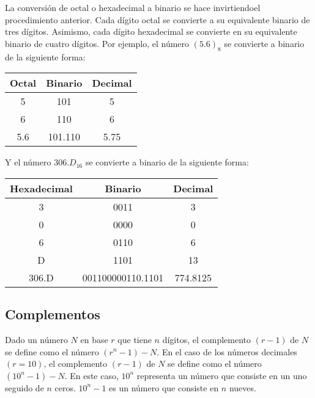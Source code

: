 \begin{metodo}
    La conversión de octal o hexadecimal a binario se hace invirtiendoel procedimiento anterior. Cada dígito octal se convierte a su equivalente binario de tres dígitos. Asimismo, cada dígito hexadecimal se convierte en su equivalente binario de cuatro dígitos. Por ejemplo, el número $(5.6)_8$ se convierte a binario de la siguiente forma:
    \begin{table}[H]
        \centering
        \begin{tabular}{c|c|c}
            \textbf{Octal} & \textbf{Binario} & \textbf{Decimal} \\ \hline
            5              & 101              & 5                \\
            6              & 110              & 6                \\
            5.6            & 101.110          & 5.75
        \end{tabular}
    \end{table}
    Y el número $306.D_{16}$ se convierte a binario de la siguiente forma:
    \begin{table}[H]
        \centering
        \begin{tabular}{c|c|c}
            \textbf{Hexadecimal} & \textbf{Binario} & \textbf{Decimal} \\ \hline
            3                    & 0011             & 3                \\
            0                    & 0000             & 0                \\
            6                    & 0110             & 6                \\
            D                    & 1101             & 13               \\
            306.D                & 001100000110.1101 & 774.8125
        \end{tabular}
    \end{table}
\end{metodo}

\subsection{Complementos}

\begin{defi}
    Dado un número $N$ en base $r$ que tiene $n$ dígitos, el complemento $(r-1)$ de $N$ se define como el número $(r^n - 1) - N$. En el caso de los números decimales $(r=10)$, el complemento $(r-1)$ de $N$ se define como el número $(10^n - 1) - N$. En este caso, $10^n$ representa un número que consiste en un uno seguido de $n$ ceros. $10^n -1$ es un número que consiste en $n$ nueves. 
\end{defi}

